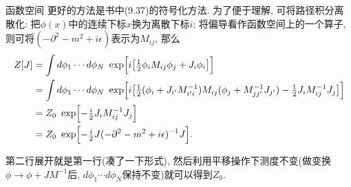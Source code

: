 \begin{mybox}{函数空间}
  更好的方法是书中(9.37)的符号化方法.
  为了便于理解, 可将路径积分离散化: 把$\phi(x)$中的连续下标$x$换为离散下标$i$; 将偏导看作函数空间上的一个算子, 则可将$(-\partial^2-m^2+i\epsilon)$表示为$M_{ij}$, 那么
  \begin{equation}
    \begin{aligned}
      Z[J] & = \int d\phi_1 \cdots d\phi_N \ \exp\Bigl[i \bigl[\tfrac{1}{2}\phi_i M_{ij}\phi_j + J_i\phi_i\bigr] \Bigr]                                                               \\
           & = \int d\phi_1 \cdots d\phi_N \ \exp\Bigl[i \bigl[\tfrac{1}{2}(\phi_i+J_{i'}M^{-1}_{i'i}) M_{ij} (\phi_j+M^{-1}_{jj'}J_{j'}) - \tfrac{1}{2}J_iM_{ij}^{-1}J_j\bigr]\Bigr] \\
           & = Z_0\ \exp\Bigl[- \tfrac{i}{2}J_iM_{ij}^{-1}J_j\Bigr]                                                                                                                   \\
           & = Z_0\ \exp\Bigl[- \tfrac{i}{2}J(-\partial^2-m^2+i\epsilon)^{-1}J\Bigr].
    \end{aligned}
  \end{equation}

  第二行展开就是第一行(凑了一下形式), 然后利用平移操作下测度不变(做变换$\phi \rightarrow \phi+JM^{-1}$后, $d\phi_1 \cdots d\phi_N$保持不变)就可以得到$Z_0$.
\end{mybox}
